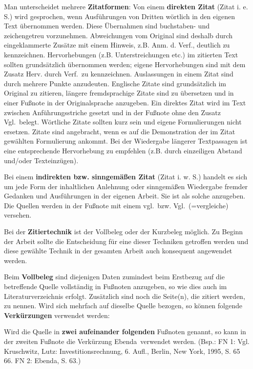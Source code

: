 \documentclass[a4paper, 12pt]{article}
\begin{document}
Man unterscheidet mehrere \textbf{Zitatformen}: Von einem \textbf{direkten Zitat}
(Zitat i. e. S.) wird gesprochen, wenn Ausf\"{u}hrungen von Dritten w\"{o}rtlich in den
eigenen Text \"{u}bernommen werden. Diese \"{U}bernahmen sind buchstaben- und zeichengetreu
vorzunehmen. Abweichungen vom Original sind deshalb durch eingeklammerte Zus\"{a}tze mit
einem Hinweis, z.B. \glqq Anm. d. Verf.\grqq, deutlich zu kennzeichnen.
Hervorhebungen (z.B. Unterstreichungen etc.) im zitierten Text sollten grunds\"{a}tzlich
\"{u}bernommen werden; eigene Hervorhebungen sind mit dem Zusatz \glqq Herv. durch
Verf.\grqq\ zu kennzeichnen. Auslassungen in einem Zitat sind durch mehrere Punkte
anzudeuten. Englische Zitate sind grunds\"{a}tzlich im Original zu zitieren, l\"{a}ngere
fremdsprachige Zitate sind zu \"{u}bersetzen und in einer Fu\ss note in der Originalsprache
anzugeben. Ein direktes Zitat wird im Text zwischen Anf\"{u}hrungsstriche gesetzt und in
der Fu\ss note ohne den Zusatz \glqq Vgl.\grqq\ belegt. W\"{o}rtliche Zitate sollten kurz
sein und eigene Formulierungen nicht ersetzen. Zitate sind angebracht, wenn es auf
die Demonstration der im Zitat gew\"{a}hlten Formulierung ankommt. Bei der Wiedergabe
l\"{a}ngerer Textpassagen ist eine entsprechende Hervorhebung zu empfehlen (z.B. durch
einzeiligen Abstand und/oder Texteinz\"{u}gen).

Bei einem \textbf{indirekten bzw. sinngem\"{a}\ss en Zitat} (Zitat i. w. S.) handelt es
sich um jede Form der inhaltlichen Anlehnung oder sinngem\"{a}\ss en Wiedergabe fremder
Gedanken und Ausf\"{u}hrungen in der eigenen Arbeit. Sie ist als solche anzugeben. Die
Quellen werden in der Fu\ss note mit einem \glqq vgl.\grqq\ bzw. \glqq Vgl.\grqq\
(=vergleiche) versehen.

Bei der \textbf{Zitiertechnik} ist der Vollbeleg oder der Kurzbeleg m\"{o}glich. Zu
Beginn der Arbeit sollte die Entscheidung f\"{u}r eine dieser Techniken getroffen werden
und diese gew\"{a}hlte Technik in der gesamten Arbeit auch konsequent angewendet werden.

Beim \textbf{Vollbeleg} sind diejenigen Daten zumindest beim Erstbezug auf die
betreffende Quelle vollst\"{a}ndig in Fu\ss noten anzugeben, so wie dies auch im
Literaturverzeichnis erfolgt. Zus\"{a}tzlich sind noch die Seite(n), die zitiert werden,
zu nennen. Wird sich mehrfach auf dieselbe Quelle bezogen, so k\"{o}nnen folgende
\textbf{Verk\"{u}rzungen} verwendet werden:

Wird die Quelle in \textbf{zwei aufeinander folgenden} Fu\ss noten genannt, so kann in
der zweiten Fu\ss note die Verk\"{u}rzung \glqq Ebenda\grqq\ verwendet werden. (Bsp.: FN 1:
Vgl. Kruschwitz, Lutz: Investitionsrechnung, 6. Aufl., Berlin, New York, 1995, S. 65
66. FN 2: Ebenda, S. 63.)
\end{document}
